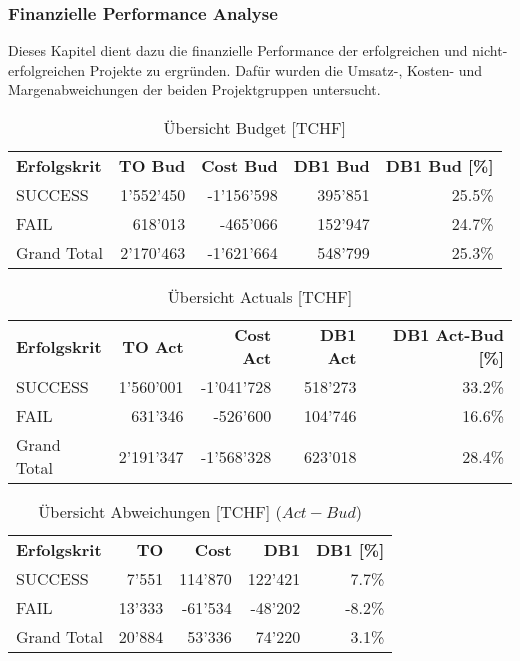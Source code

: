 \subsubsection{Finanzielle Performance Analyse}
Dieses Kapitel dient dazu die finanzielle Performance der erfolgreichen und nicht-erfolgreichen Projekte zu ergründen. Dafür wurden die Umsatz-, Kosten- und Margenabweichungen der beiden Projektgruppen untersucht.
\newline
\begin{table}[htbp]
	\centering
	\caption{Übersicht Budget [TCHF]}
	\begin{tabular}{lrrrr}
		\textbf{Erfolgskrit} & \textbf{TO Bud} & \textbf{Cost Bud} &
		\textbf{DB1 Bud} & \textbf{DB1 Bud [\%]} \\
	SUCCESS & 1'552'450 & -1'156'598 & 395'851 & 25.5\% \\
	FAIL  & 618'013 & -465'066 & 152'947 & 24.7\% \\
	Grand Total & 2'170'463 & -1'621'664 & 548'799 & 25.3\% \\
	\end{tabular}%
\label{tab:addlabel}%
\end{table}%
\begin{table}[htbp]
	\centering
	\caption{Übersicht Actuals [TCHF]}
	\begin{tabular}{lrrrr}
		\textbf{Erfolgskrit} & \textbf{TO Act} & \textbf{Cost Act} & \textbf{DB1 Act}&
		\textbf{DB1 Act-Bud [\%]} \\
			SUCCESS & 1'560'001 & -1'041'728 & 518'273 & 33.2\% \\
			FAIL  & 631'346 & -526'600 & 104'746 & 16.6\% \\
			Grand Total & 2'191'347 & -1'568'328 & 623'018 & 28.4\% \\
	\end{tabular}
\label{tab:addlabel}%
\end{table}%
\begin{table}[htbp]
\centering
\caption{Übersicht Abweichungen [TCHF] ($Act-Bud$)}
\begin{tabular}{lrrrr}
	\textbf{Erfolgskrit} & \textbf{TO} & \textbf{Cost} & \textbf{DB1}&
	\textbf{DB1 [\%]} \\
	SUCCESS & 7'551 & 114'870 & 122'421 & 7.7\% \\
	FAIL  & 13'333 & -61'534 & -48'202 & -8.2\% \\
	Grand Total & 20'884 & 53'336 & 74'220 & 3.1\% \\
\end{tabular}
\label{tab:addlabel}%
\end{table}%
